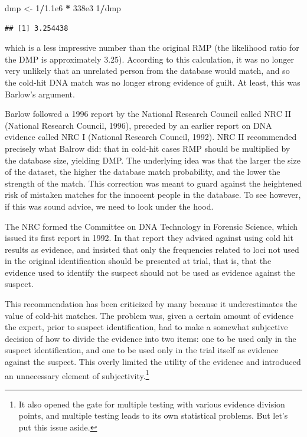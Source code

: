 \documentclass[10pt,dvipsnames,enabledeprecatedfontcommands]{scrartcl}
\newenvironment{Shaded}{\begin{snugshade}}{\end{snugshade}}
\newcommand{\DecValTok}[1]{\textcolor[rgb]{0.00,0.00,0.81}{#1}}
\newcommand{\FloatTok}[1]{\textcolor[rgb]{0.00,0.00,0.81}{#1}}
\newcommand{\NormalTok}[1]{#1}
\newcommand{\OperatorTok}[1]{\textcolor[rgb]{0.81,0.36,0.00}{\textbf{#1}}}
\newcommand{\StringTok}[1]{\textcolor[rgb]{0.31,0.60,0.02}{#1}}
\begin{document}

\begin{Shaded}
\begin{Highlighting}[]
\NormalTok{dmp <-}\StringTok{ }\DecValTok{1}\OperatorTok{/}\FloatTok{1.1e6} \OperatorTok{*}\StringTok{ }\FloatTok{338e3}
\DecValTok{1}\OperatorTok{/}\NormalTok{dmp}
\end{Highlighting}
\end{Shaded}

\begin{verbatim}
## [1] 3.254438
\end{verbatim}

\noindent which is a less impressive number than the original RMP (the
likelihood ratio for the DMP is approximately 3.25). According to this
calculation, it was no longer very unlikely that an unrelated person
from the database would match, and so the cold-hit DNA match was no
longer strong evidence of guilt. At least, this was Barlow's argument.

Barlow followed a 1996 report by the National Research Council called
NRC II (National Research Council, 1996), preceded by an earlier report
on DNA evidence called NRC I (National Research Council, 1992). NRC II
recommended precisely what Balrow did: that in cold-hit cases RMP should
be multiplied by the database size, yielding DMP. The underlying idea
was that the larger the size of the dataset, the higher the database
match probability, and the lower the strength of the match. This
correction was meant to guard against the heightened risk of mistaken
matches for the innocent people in the database. To see however, if this
was sound advice, we need to look under the hood.

The NRC formed the Committee on DNA Technology in Forensic Science,
which issued its first report in 1992. In that report they advised
against using cold hit results as evidence, and insisted that only the
frequencies related to loci not used in the original identification
should be presented at trial, that is, that the evidence used to
identify the suspect should not be used as evidence against the suspect.

This recommendation has been criticized by many because it
underestimates the value of cold-hit matches. The problem was, given a
certain amount of evidence the expert, prior to suspect identification,
had to make a somewhat subjective decision of how to divide the evidence
into two items: one to be used only in the suspect identification, and
one to be used only in the trial itself as evidence against the suspect.
This overly limited the utility of the evidence and introduced an
unnecessary element of
subjectivity.\footnote{It also opened the gate for multiple testing with various evidence division points, and multiple testing leads to its own statistical problems. But let's put this issue aside.}
\end{document}
